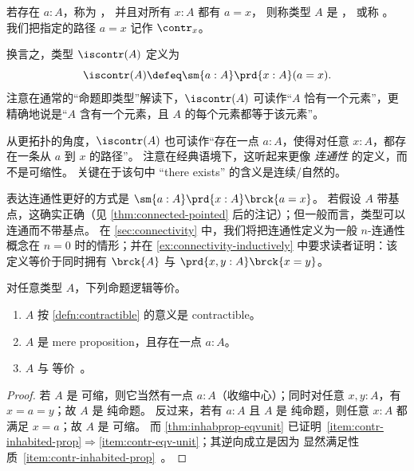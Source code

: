 \begin{defn}\label{defn:contractible}
  若存在 $a:A$，称为 ，
  并且对所有 $x:A$ 都有 $a=x$，
  则称类型 $A$ 是 ，
  或称 。
  我们把指定的路径 $a=x$ 记作 $\contr_x$。
\end{defn}

换言之，类型 $\iscontr(A)$ 定义为
\[ \iscontr(A) \defeq \sm{a:A} \prd{x:A}(a=x). \]
注意在通常的“命题即类型”解读下，$\iscontr(A)$ 可读作“$A$ 恰有一个元素”，更精确地说是“$A$ 含有一个元素，且 $A$ 的每个元素都等于该元素”。

\begin{rmk}
  从更拓扑的角度，$\iscontr(A)$ 也可读作“存在一点 $a:A$，使得对任意 $x:A$，都存在一条从 $a$ 到 $x$ 的路径”。
  注意在经典语境下，这听起来更像 \emph{连通性} 的定义，而不是可缩性。
  关键在于该句中 “there exists” 的含义是连续/自然的。

  表达连通性更好的方式是 $\sm{a:A}\prd{x:A} \brck{a=x}$。
  若假设 $A$ 带基点，这确实正确（见 \cref{thm:connected-pointed} 后的注记）；但一般而言，类型可以连通而不带基点。
  在 \cref{sec:connectivity} 中，我们将把连通性定义为一般 $n$-连通性概念在 $n=0$ 时的情形；并在 \cref{ex:connectivity-inductively} 中要求读者证明：该定义等价于同时拥有 $\brck{A}$ 与 $\prd{x,y:A} \brck{x=y}$。
\end{rmk}

\begin{lem}\label{thm:contr-unit}
  对任意类型 $A$，下列命题逻辑等价。
  \begin{enumerate}
  \item $A$ 按 \cref{defn:contractible} 的意义是 contractible。\label{item:contr}
  \item $A$ 是 mere proposition，且存在一点 $a:A$。\label{item:contr-inhabited-prop}
  \item $A$ 与 \unit 等价。\label{item:contr-eqv-unit}
  \end{enumerate}
\end{lem}
\begin{proof}
  若 $A$ 是 可缩，则它当然有一点 $a:A$（收缩中心）；同时对任意 $x,y:A$，有 $x=a=y$；故 $A$ 是 纯命题。
  反过来，若有 $a:A$ 且 $A$ 是 纯命题，则任意 $x:A$ 都满足 $x=a$；故 $A$ 是 可缩。
  而 \cref{thm:inhabprop-eqvunit} 已证明~\ref{item:contr-inhabited-prop}$\Rightarrow$\ref{item:contr-eqv-unit}；其逆向成立是因为 \unit 显然满足性质~\ref{item:contr-inhabited-prop}。
\end{proof}

